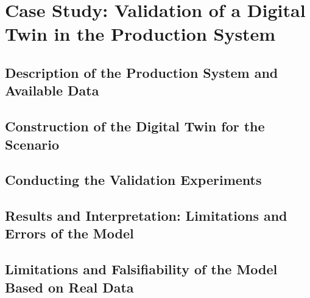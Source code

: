 \chapter{Case Study: Validation of a Digital Twin in the Production System}
\label{chap:case-study}

\section{Description of the Production System and Available Data}


\section{Construction of the Digital Twin for the Scenario}

\section{Conducting the Validation Experiments}

\section{Results and Interpretation: Limitations and Errors of the Model}

\section{Limitations and Falsifiability of the Model Based on Real Data}
